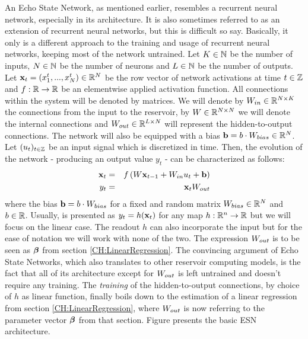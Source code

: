 An Echo State Network, as mentioned earlier, resembles a recurrent neural network, especially in its architecture. It is also sometimes referred to as an extension of recurrent neural networks, but this is difficult so say. Basically, it only is a different approach to the training and usage of recurrent neural networks, keeping most of the network untrained. Let $K \in \mathbb{N}$ be the number of inputs, $N \in \mathbb{N}$ be the number of neurons and $L \in \mathbb{N}$ be the number of outputs. Let ${\bf x}_t = \left(x_1^t, ..., x_N^t\right) \in \mathbb{R}^{N}$ be the row vector of network activations at time $t \in \mathbb{Z}$ and $f: \mathbb{R} \to \mathbb{R}$ be an elementwise applied activation function. All connections within the system will be denoted by matrices. We will denote by $W_{in} \in \mathbb{R}^{N\times K}$ the connections from the input to the reservoir, by $W \in \mathbb{R}^{N\times N}$ we will denote the internal connections and $W_{out} \in \mathbb{R}^{L \times N}$ will represent the hidden-to-output connections. The network will also be equipped with a bias ${\bf b} = b\cdot W_{bias} \in \mathbb{R}^{N}$.
Let $(u_t)_{t\in\mathbb{Z}}$ be an input signal which is discretized in time. Then, the evolution of the network - producing an output value $y_t$ - can be characterized as follows:
\begin{eqnarray}
    {\bf x}_{t} & = & f\left(W{\bf x}_{t-1} + W_{in} u_t +  {\bf b}\right) \label{EQ:ReservoirUpdate} \\
    y_t & = & {\bf x}_{t} W_{out} \label{EQ:ReservoirReadout}
\end{eqnarray}
where the bias ${\bf b} = b \cdot W_{bias}$ for a fixed and random matrix $W_{bias} \in \mathbb{R}^{N}$ and $b \in \mathbb{R}$.
Usually,  is presented as $y_t = h({\bf x}_t)$ for any map $h: \mathbb{R}^n \to \mathbb{R}$ but we will focus on the linear case. The readout $h$ can also incorporate the input but for the ease of notation we will work with none of the two. The expression $W_{out}$ is to be seen as ${{\bm \beta}}$ from section \ref{CH:LinearRegression}.
The convincing argument of Echo State Networks, which also translates to other reservoir computing models, is the fact that all of its architecture except for $W_{out}$ is left untrained and doesn't require any training. The \textit{training} of the hidden-to-output connections, by choice of $h$ as linear function, finally boils down to the estimation of a linear regression from section \ref{CH:LinearRegression}, where $W_{out}$ is now referring to the parameter vector ${{\bm \beta}}$ from that section.
Figure  presents the basic ESN architecture.

